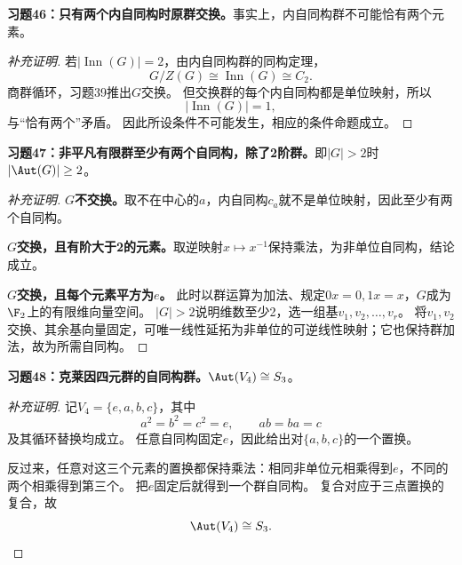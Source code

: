 \begin{problem}
\textbf{习题46：只有两个内自同构时原群交换。}事实上，内自同构群不可能恰有两个元素。
\end{problem}
\begin{proof}[补充证明]
若$|\operatorname{Inn}(G)|=2$，由内自同构群的同构定理，
\[
G/Z(G)\cong\operatorname{Inn}(G)\cong C_2.
\]
商群循环，习题39推出$G$交换。
但交换群的每个内自同构都是单位映射，所以
\[
|\operatorname{Inn}(G)|=1,
\]
与“恰有两个”矛盾。
因此所设条件不可能发生，相应的条件命题成立。
\end{proof}

\begin{problem}
\textbf{习题47：非平凡有限群至少有两个自同构，除了2阶群。}即$|G|>2$时$|\Aut(G)|\geq2$。
\end{problem}
\begin{proof}[补充证明]
\textbf{$G$不交换。}取不在中心的$a$，内自同构$c_a$就不是单位映射，因此至少有两个自同构。

\textbf{$G$交换，且有阶大于2的元素。}取逆映射$x\mapsto x^{-1}$保持乘法，为非单位自同构，结论成立。

\textbf{$G$交换，且每个元素平方为$e$。}
此时以群运算为加法、规定$0x=0,1x=x$，$G$成为$\F_2$上的有限维向量空间。
$|G|>2$说明维数至少2，选一组基$v_1,v_2,\ldots,v_r$。
将$v_1,v_2$交换、其余基向量固定，可唯一线性延拓为非单位的可逆线性映射；它也保持群加法，故为所需自同构。
\end{proof}

\begin{problem}
\textbf{习题48：克莱因四元群的自同构群。}$\Aut(V_4)\cong S_3$。
\end{problem}
\begin{proof}[补充证明]
记$V_4=\{e,a,b,c\}$，其中
\[
a^2=b^2=c^2=e,\qquad ab=ba=c
\]
及其循环替换均成立。
任意自同构固定$e$，因此给出对$\{a,b,c\}$的一个置换。

反过来，任意对这三个元素的置换都保持乘法：相同非单位元相乘得到$e$，不同的两个相乘得到第三个。
把$e$固定后就得到一个群自同构。
复合对应于三点置换的复合，故
\[
\Aut(V_4)\cong S_3.
\]
\end{proof}

